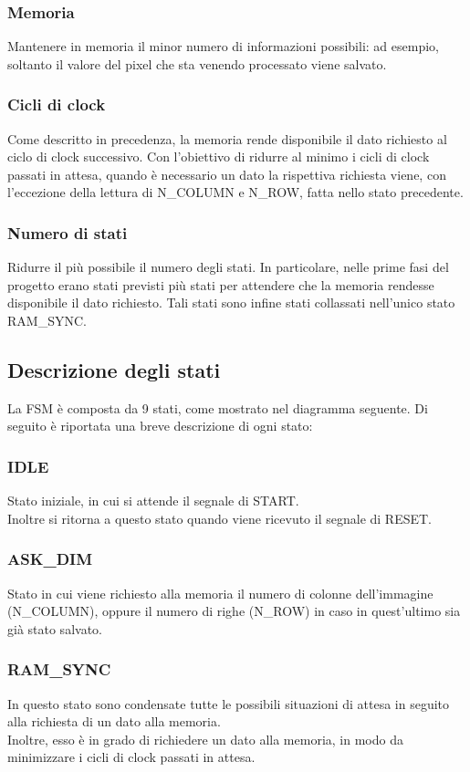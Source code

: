 \documentclass[a4paper, 12pt]{article}
\begin{document}
\subsubsection{Memoria}
Mantenere in memoria il minor numero di informazioni possibili: ad esempio, soltanto il valore del pixel che sta venendo processato viene salvato.

\subsubsection{Cicli di clock}
Come descritto in precedenza, la memoria rende disponibile il dato richiesto al ciclo di clock successivo. Con l'obiettivo di ridurre al minimo i cicli di clock passati in attesa, quando è necessario un dato la rispettiva richiesta viene, con l'eccezione della lettura di N\_COLUMN e N\_ROW, fatta nello stato precedente.

\subsubsection{Numero di stati} 
Ridurre il più possibile il numero degli stati. In particolare, nelle prime fasi del progetto erano stati previsti più stati per attendere che la memoria rendesse disponibile il dato richiesto. Tali stati sono infine stati collassati nell'unico stato RAM\_SYNC.


\bigskip
\subsection{Descrizione degli stati}
La FSM è composta da 9 stati, come mostrato nel diagramma seguente.
Di seguito è riportata una breve descrizione di ogni stato:

\subsubsection{IDLE}
Stato iniziale, in cui si attende il segnale di START. \\
Inoltre si ritorna a questo stato quando viene ricevuto il segnale di RESET.
\subsubsection{ASK\_DIM}
Stato in cui viene richiesto alla memoria il numero di colonne dell'immagine (N\_COLUMN), oppure il numero di righe (N\_ROW) in caso in quest'ultimo sia già stato salvato.
\subsubsection{RAM\_SYNC}
In questo stato sono condensate tutte le possibili situazioni di attesa in seguito alla richiesta di un dato alla memoria. \\
Inoltre, esso è in grado di richiedere un dato alla memoria, in modo da minimizzare i cicli di clock passati in attesa.
\end{document}
